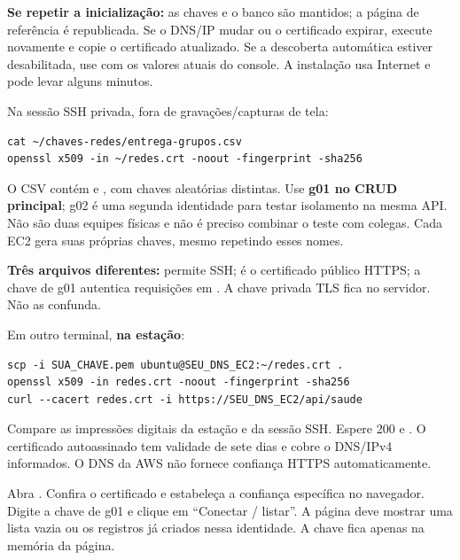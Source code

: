 
\textbf{Se repetir a inicialização:} as chaves e o banco são mantidos; a página de referência é republicada. Se o DNS/IP mudar ou o certificado expirar, execute novamente e copie o certificado atualizado. Se a descoberta automática estiver desabilitada, use  com os valores atuais do console. A instalação usa Internet e pode levar alguns minutos.

Na sessão SSH privada, fora de gravações/capturas de tela:
\begin{lstlisting}
cat ~/chaves-redes/entrega-grupos.csv
openssl x509 -in ~/redes.crt -noout -fingerprint -sha256
\end{lstlisting}
O CSV contém  e , com chaves aleatórias distintas. Use \textbf{g01 no CRUD principal}; g02 é uma segunda identidade para testar isolamento na mesma API. Não são duas equipes físicas e não é preciso combinar o teste com colegas. Cada EC2 gera suas próprias chaves, mesmo repetindo esses nomes.

\textbf{Três arquivos diferentes:}  permite SSH;  é o certificado público HTTPS; a chave de g01 autentica requisições em . A chave privada TLS fica no servidor. Não as confunda.

Em outro terminal, \textbf{na estação}:
\begin{lstlisting}
scp -i SUA_CHAVE.pem ubuntu@SEU_DNS_EC2:~/redes.crt .
openssl x509 -in redes.crt -noout -fingerprint -sha256
curl --cacert redes.crt -i https://SEU_DNS_EC2/api/saude
\end{lstlisting}
Compare as impressões digitais da estação e da sessão SSH. Espere 200 e . O certificado autoassinado tem validade de sete dias e cobre o DNS/IPv4 informados. O DNS da AWS não fornece confiança HTTPS automaticamente.

Abra . Confira o certificado e estabeleça a confiança específica no navegador. Digite a chave de g01 e clique em ``Conectar / listar''. A página deve mostrar uma lista vazia ou os registros já criados nessa identidade. A chave fica apenas na memória da página.

